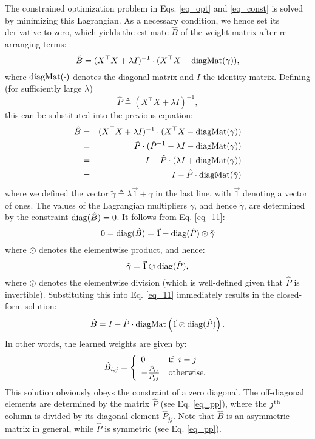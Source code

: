 \documentclass[sigconf]{acmart}
\newcommand{\W}{B}
\newcommand{\X}{X}
\newcommand{\Y}{X}
\newcommand{\Wzero}{\hat{\W}  }
\newcommand{\PP}{\hat{P}}
\newcommand{\diag}{{\rm diag}}
\newcommand{\dMat}{{\rm diagMat}}
\begin{document}
The constrained optimization problem in  Eqs. \ref{eq_opt} and \ref{eq_const} is  solved by minimizing this Lagrangian. As a necessary condition, we hence set its derivative  to zero, which yields the estimate $\Wzero$ of the weight matrix  after re-arranging terms:
\begin{equation}
\Wzero = (\X^\top \X + \lambda I)^{-1} \cdot(\X^\top \Y - \dMat(\gamma)  ) ,
\nonumber
\end{equation}
where $\dMat(\cdot)$ denotes the  diagonal matrix and $I$ the identity matrix.
Defining (for sufficiently large $\lambda$)
\begin{equation}
\PP  \triangleq  (\X^\top \X + \lambda I)^{-1},
\label{eq_pp}
\end{equation}
this can be substituted into the previous equation:
\begin{eqnarray}
\Wzero &=& (\X^\top \X + \lambda I)^{-1} \cdot(\X^\top \Y - \dMat(\gamma)  )\nonumber\\
 &=& \PP \cdot(\PP^{-1} - \lambda I - \dMat(\gamma)  )\nonumber\\
 &=& I- \PP \cdot \left( \lambda I + \dMat(\gamma)  \right)\nonumber\\
 &=& I- \PP \cdot  \dMat(\tilde{\gamma})  
\label{eq_11}
\end{eqnarray}
where we defined the vector $\tilde{\gamma} \triangleq \lambda \vec{1}+\gamma $ in the last line, with $\vec{1}$ denoting a vector of ones.
The values of the Lagrangian multipliers $\gamma$, and hence $\tilde{\gamma}$, are determined by  the constraint $\diag(\Wzero)=0$. It follows  from Eq. \ref{eq_11}:
\begin{equation}
0=\diag(\Wzero) = \vec{1}  - \diag(\PP) \odot \tilde{\gamma}
\label{eq_lag}
\end{equation}
where $\odot$ denotes the elementwise product, and hence:
\begin{equation}
\tilde{\gamma} = \vec{1} \oslash \diag(\PP) , \nonumber
\end{equation}
where $\oslash$ denotes the elementwise division (which is well-defined given that $\PP$ is invertible).
Substituting this  into Eq. \ref{eq_11} immediately results in the closed-form solution:
\begin{equation}
\Wzero =   I- \PP \cdot \dMat\left( \vec{1}\oslash \diag(\PP)\right) .
\label{eq_w1}
\end{equation}
In other words, the learned weights  are given by:
\begin{equation}
\Wzero_{i,j} = \left\{
  \begin{array}{ll}
     0& {\rm if}\,\,\, i=j\\
     -\frac{\PP_{ij}}{\PP_{jj}}&{\rm otherwise.}
  \end{array}
\right .
\label{eq_w2}
\end{equation}
This solution obviously obeys the constraint of a zero diagonal. The off-diagonal elements are determined by the matrix $\PP$ (see Eq. \ref{eq_pp}), where the $j^{\rm th}$ column is divided by its diagonal element $\PP_{jj}$. Note that $\Wzero$ is an asymmetric matrix in general, while $\PP$ is symmetric (see Eq. \ref{eq_pp}).
\end{document}
